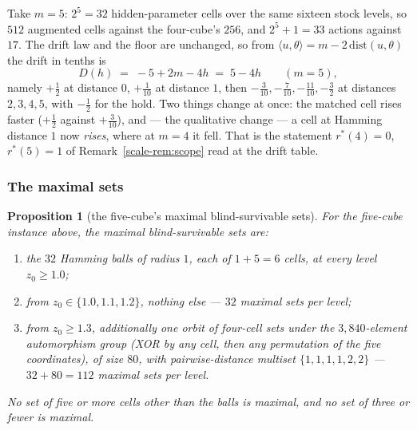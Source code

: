\documentclass[10pt,twocolumn]{article}
\theoremstyle{plain}
\newtheorem{proposition}[theorem]{Proposition}
\theoremstyle{definition}
\theoremstyle{remark}
\begin{document}
Take \(m = 5\): \(2^{5} = 32\) hidden-parameter cells over the same sixteen stock levels, so
\(512\) augmented cells against the four-cube's \(256\), and \(2^{5} + 1 = 33\) actions
against \(17\). The drift law and the floor are unchanged, so from
\(\langle u, \theta\rangle = m - 2\,\mathrm{dist}(u,\theta)\) the drift in tenths is
\[
D(h) \;=\; -5 + 2m - 4h \;=\; 5 - 4h \qquad (m = 5),
\]
namely \(+\tfrac12\) at distance \(0\), \(+\tfrac1{10}\) at distance \(1\), then
\(-\tfrac3{10}, -\tfrac7{10}, -\tfrac{11}{10}, -\tfrac32\) at distances \(2,3,4,5\), with
\(-\tfrac12\) for the hold. Two things change at once: the matched cell rises faster
(\(+\tfrac12\) against \(+\tfrac3{10}\)), and --- the qualitative change --- a cell at
Hamming distance \(1\) now \emph{rises}, where at \(m = 4\) it fell. That is the statement
\(r^{*}(4) = 0\), \(r^{*}(5) = 1\) of Remark~\ref{scale-rem:scope} read at the drift table.

\subsubsection{The maximal sets}

\begin{proposition}[the five-cube's maximal blind-survivable sets]
\label{scale-prop:five}
For the five-cube instance above, the maximal blind-survivable sets are:
\begin{enumerate}
\item the \(32\) Hamming balls of radius \(1\), each of \(1 + 5 = 6\) cells, at \emph{every}
level \(z_{0} \ge 1.0\);
\item from \(z_{0} \in \{1.0, 1.1, 1.2\}\), \emph{nothing else} --- \(32\) maximal sets per
level;
\item from \(z_{0} \ge 1.3\), additionally one orbit of four-cell sets under the
\(3{,}840\)-element automorphism group (XOR by any cell, then any permutation of the five
coordinates), of size \(80\), with pairwise-distance multiset \(\{1,1,1,1,2,2\}\) ---
\(32 + 80 = 112\) maximal sets per level.
\end{enumerate}
No set of five or more cells other than the balls is maximal, and no set of three or fewer
is maximal.
\end{proposition}
\end{document}
